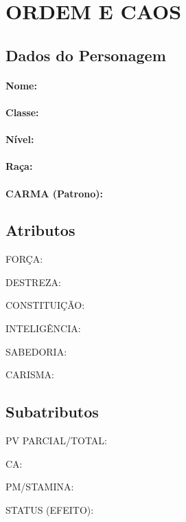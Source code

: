 \documentclass[10pt,twoside,twocolumn]{book}
\begin{document}
\selectfont %
\frontmatter

\mainmatter
\chapter*{ORDEM E CAOS}

\section*{Dados do Personagem}
\subsubsection*{Nome:}
\subsubsection*{Classe:}
\subsubsection*{Nível:}
\subsubsection*{Raça:}
\subsubsection*{CARMA (Patrono):}

\section*{Atributos}
\begin{rpg-quotebox}{}
     \begin{rpg-list}
       \item FORÇA: 
       \item DESTREZA:
       \item CONSTITUIÇÃO:
       \item INTELIGÊNCIA: 
       \item SABEDORIA:
       \item CARISMA: 
  	\end{rpg-list}
\end{rpg-quotebox}

\section*{Subatributos}
\begin{rpg-quotebox}{}
     \begin{rpg-list}
       \item PV PARCIAL/TOTAL:
       \item CA:
       \item PM/STAMINA:
       \item STATUS (EFEITO):
  	\end{rpg-list}
\end{rpg-quotebox}
\end{document}
